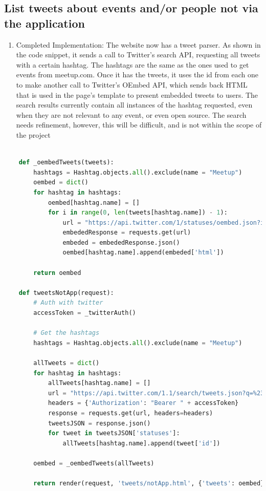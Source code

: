 \documentclass[draftclsnofoot,10pt,onecolumn]{IEEEtran} %
\begin{document}
\subsection{List tweets about events and/or people not via the application}
\begin{enumerate}[label*=\arabic*.]
  \item Completed Implementation: The website now has a tweet parser. As shown
    in the code snippet, it sends a call to Twitter's search API, requesting all
    tweets with a certain hashtag. The hashtags are the same as the ones used to
    get events from meetup.com. Once it has the tweets, it uses the id from each
    one to make another call to Twitter's OEmbed API, which sends back HTML that
    is used in the page's template to present embedded tweets to users.  The
    search results currently contain all instances of the hashtag requested,
    even when they are not relevant to any event, or even open source. The
    search needs refinement, however, this will be difficult, and is not within
    the scope of the project
\end{enumerate}

\begin{center}
\captionsetup{width=.5\linewidth}
  \begin{lstlisting}[caption=Views.py showing the Twitter authorization and
  searching for tweets for the tweets not from the application, language=Python]
   
    def _oembedTweets(tweets):
        hashtags = Hashtag.objects.all().exclude(name = "Meetup")
        oembed = dict()
        for hashtag in hashtags:
            oembed[hashtag.name] = []
            for i in range(0, len(tweets[hashtag.name]) - 1):
                url = "https://api.twitter.com/1/statuses/oembed.json?id=" + str(tweets[hashtag.name][i])
                embededResponse = requests.get(url)
                embeded = embededResponse.json()
                oembed[hashtag.name].append(embeded['html'])

        return oembed

    def tweetsNotApp(request):
        # Auth with twitter
        accessToken = _twitterAuth()

        # Get the hashtags
        hashtags = Hashtag.objects.all().exclude(name = "Meetup")

        allTweets = dict()
        for hashtag in hashtags:
            allTweets[hashtag.name] = []
            url = "https://api.twitter.com/1.1/search/tweets.json?q=%23" + hashtag.name + "&src=typd"
            headers = {'Authorization': "Bearer " + accessToken}
            response = requests.get(url, headers=headers)
            tweetsJSON = response.json()
            for tweet in tweetsJSON['statuses']:
                allTweets[hashtag.name].append(tweet['id'])

        oembed = _oembedTweets(allTweets)

        return render(request, 'tweets/notApp.html', {'tweets': oembed})
  \end{lstlisting}
\end{center}
\end{document}
